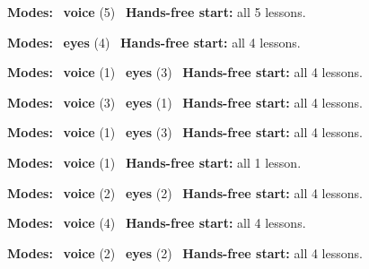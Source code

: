 \expandafter\def\csname hlchaptermodality6\endcsname{%
  {\small\noindent
    \textbf{Modes:} \hlvoicesign{}~\textbf{voice} (5)\quad
    \hlvoicesign{}~\textbf{Hands-free start:} all 5 lessons.%
    \par}\medskip
}

\expandafter\def\csname hlchaptermodality7\endcsname{%
  {\small\noindent
    \textbf{Modes:} \hlsightsign{}~\textbf{eyes} (4)\quad
    \hlvoicesign{}~\textbf{Hands-free start:} all 4 lessons.%
    \par}\medskip
}

\expandafter\def\csname hlchaptermodality8\endcsname{%
  {\small\noindent
    \textbf{Modes:} \hlvoicesign{}~\textbf{voice} (1) \quad \hlsightsign{}~\textbf{eyes} (3)\quad
    \hlvoicesign{}~\textbf{Hands-free start:} all 4 lessons.%
    \par}\medskip
}

\expandafter\def\csname hlchaptermodality9\endcsname{%
  {\small\noindent
    \textbf{Modes:} \hlvoicesign{}~\textbf{voice} (3) \quad \hlsightsign{}~\textbf{eyes} (1)\quad
    \hlvoicesign{}~\textbf{Hands-free start:} all 4 lessons.%
    \par}\medskip
}

\expandafter\def\csname hlchaptermodality10\endcsname{%
  {\small\noindent
    \textbf{Modes:} \hlvoicesign{}~\textbf{voice} (1) \quad \hlsightsign{}~\textbf{eyes} (3)\quad
    \hlvoicesign{}~\textbf{Hands-free start:} all 4 lessons.%
    \par}\medskip
}

\expandafter\def\csname hlchaptermodality11\endcsname{%
  {\small\noindent
    \textbf{Modes:} \hlvoicesign{}~\textbf{voice} (1)\quad
    \hlvoicesign{}~\textbf{Hands-free start:} all 1 lesson.%
    \par}\medskip
}

\expandafter\def\csname hlchaptermodality12\endcsname{%
  {\small\noindent
    \textbf{Modes:} \hlvoicesign{}~\textbf{voice} (2) \quad \hlsightsign{}~\textbf{eyes} (2)\quad
    \hlvoicesign{}~\textbf{Hands-free start:} all 4 lessons.%
    \par}\medskip
}

\expandafter\def\csname hlchaptermodality13\endcsname{%
  {\small\noindent
    \textbf{Modes:} \hlvoicesign{}~\textbf{voice} (4)\quad
    \hlvoicesign{}~\textbf{Hands-free start:} all 4 lessons.%
    \par}\medskip
}

\expandafter\def\csname hlchaptermodality14\endcsname{%
  {\small\noindent
    \textbf{Modes:} \hlvoicesign{}~\textbf{voice} (2) \quad \hlsightsign{}~\textbf{eyes} (2)\quad
    \hlvoicesign{}~\textbf{Hands-free start:} all 4 lessons.%
    \par}\medskip
}

